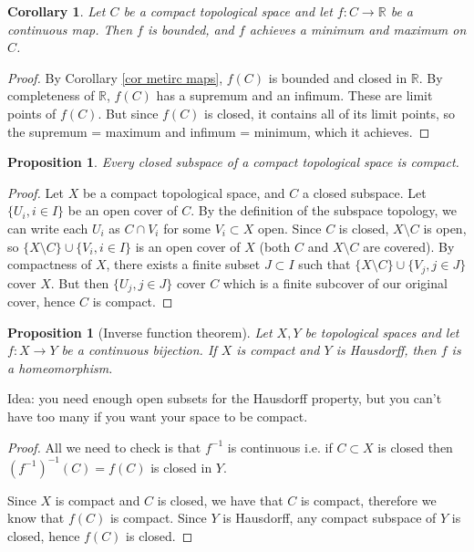 \documentclass{article}
\theoremstyle{definition}
\theoremstyle{plain}%
\newtheorem{prop}[thm]{Proposition}
\newtheorem*{cor}{Corollary}
\theoremstyle{remark}
\newcommand{\union}{\cup}
\newcommand{\intersection}{\cap}
\newcommand{\R}{\mathbb{R}}
\begin{document}
\begin{cor}
    Let $C$ be a compact topological space and let $f : C \to \R$ be a continuous map. Then $f$ is bounded, and $f$ achieves a minimum and maximum on $C$.
\end{cor}

\begin{proof}
    By Corollary \ref{cor metirc maps}, $f(C)$ is bounded and closed in $\R$. By completeness of $\R$, $f(C)$ has a supremum and an infimum. These are limit points of $f(C)$. But since $f(C)$ is closed, it contains all of its limit points, so the supremum = maximum and infimum = minimum, which it achieves.
\end{proof}

\begin{prop}
    Every closed subspace of a compact topological space is compact.
\end{prop}

\begin{proof}
    Let $X$ be a compact topological space, and $C$ a closed subspace. Let $\{U_i, i \in I\}$ be an open cover of $C$. By the definition of the subspace topology, we can write each $U_i$ as $C \intersection V_i$ for some $V_i \subset X$ open. Since $C$ is closed, $X \setminus C$ is open, so $\{X \setminus C\} \union \{V_i, i \in I\}$ is an open cover of $X$ (both $C$ and $X \setminus C$ are covered). By compactness of $X$, there exists a finite subset $J \subset I$ such that $\{X \setminus C\} \union \{V_j, j \in J\}$ cover $X$. But then $\{U_j, j \in J\}$ cover $C$ which is a finite subcover of our original cover, hence $C$ is compact.
\end{proof}

\begin{prop}[Inverse function theorem]
    Let $X,Y$ be topological spaces and let $f: X \to Y$ be a continuous bijection. If $X$ is compact and $Y$ is Hausdorff, then $f$ is a homeomorphism.
\end{prop}

Idea: you need enough open subsets for the Hausdorff property, but you can't have too many if you want your space to be compact.

\begin{proof}
    All we need to check is that $f^{-1}$ is continuous i.e. if $C \subset X$ is closed then $(f^{-1})^{-1}(C) = f(C)$ is closed in $Y$.
    
    Since $X$ is compact and $C$ is closed, we have that $C$ is compact, therefore we know that $f(C)$ is compact. Since $Y$ is Hausdorff, any compact subspace of $Y$ is closed, hence $f(C)$ is closed.
\end{proof}
\end{document}
